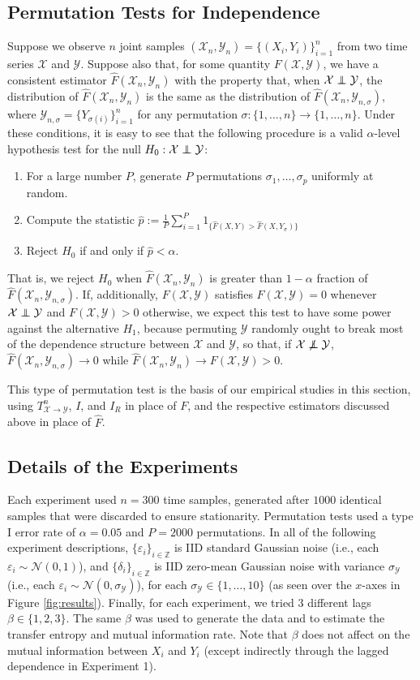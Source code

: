 \documentclass{article} %
\newcommand{\e}{\varepsilon}                        %
\newcommand{\X}{\mathcal{X}}                        %
\newcommand{\Y}{\mathcal{Y}}                        %
\renewcommand{\hat}{\widehat}
\newcommand\ind{\protect\mathpalette{\protect\independenT}{\perp}}
\def\independenT#1#2{\mathrel{\rlap{$#1#2$}\mkern2mu{#1#2}}}
\begin{document}
\subsection{Permutation Tests for Independence}
Suppose we observe $n$ joint samples $(\X_n,\Y_n) = \{(X_i,Y_i)\}_{i = 1}^n$
from two time series $\X$ and $\Y$. Suppose also that, for some quantity
$F(\X,\Y)$, we have a consistent estimator $\hat F(\X_n,\Y_n)$ with the
property that, when $\X \ind \Y$, the distribution of $\hat F(\X_n,\Y_n)$ is
the same as the distribution of $\hat F(\X_n,\Y_{n,\sigma})$, where
$\Y_{n,\sigma} = \{Y_{\sigma(i)}\}_{i = 1}^n$ for any permutation
$\sigma : \{1,\dots,n\} \to \{1,\dots,n\}$. Under these conditions, it is easy
to see that the following procedure is a valid $\alpha$-level hypothesis test
for the null $H_0 : \X \ind \Y$:
\begin{enumerate}
\item For a large number $P$, generate $P$ permutations
$\sigma_1,\dots,\sigma_p$ uniformly at random.
\item Compute the statistic
$\hat p := \frac{1}{P} \sum_{i = 1}^P 1_{\{\hat F(X,Y) > \hat F(X,Y_\sigma)\}}$
\item Reject $H_0$ if and only if $\hat p < \alpha$.
\end{enumerate}
That is, we reject $H_0$ when $\hat F(\X_n,\Y_n)$ is greater than $1 - \alpha$
fraction of $\hat F(\X_n,\Y_{n,\sigma})$. If, additionally, $F(\X,\Y)$
satisfies $F(\X,\Y) = 0$ whenever $\X \ind \Y$ and $F(\X,\Y) > 0$ otherwise,
we expect this test to have some power against the alternative $H_1$, because
permuting $\Y$ randomly ought to break most of the dependence structure between
$\X$ and $\Y$, so that, if $\X \not\ind \Y$,
$\hat F(\X_n,\Y_{n,\sigma}) \to 0$ while $\hat F(\X_n,\Y_n) \to F(\X,\Y) > 0$.

This type of permutation test is the basis of our empirical studies in this
section, using $T_{\X \to \Y}^n$, $I$, and $I_R$ in place of $F$, and the
respective estimators discussed above in place of $\hat F$.

\subsection{Details of the Experiments}
Each experiment used $n = 300$ time samples, generated after $1000$ identical
samples that were discarded to ensure stationarity. Permutation tests used a
type I error rate of $\alpha = 0.05$ and $P = 2000$ permutations. In all of the
following experiment descriptions, $\{\e_i\}_{i \in \mathbb{Z}}$ is IID
standard Gaussian noise (i.e., each $\e_i \sim \mathcal{N}(0,1)$), and
$\{\delta_i\}_{i \in \mathbb{Z}}$ is IID zero-mean Gaussian noise with variance
$\sigma_\Y$ (i.e., each $\e_i \sim \mathcal{N}(0,\sigma_\Y)$), for each
$\sigma_\Y \in \{1,\dots,10\}$ (as seen over the $x$-axes in Figure
\ref{fig:results}). Finally, for each experiment, we tried $3$ different lags
$\beta \in \{1,2,3\}$. The same $\beta$ was used to generate the data and to
estimate the transfer entropy and mutual information rate. Note that $\beta$
does not affect on the mutual information between $X_i$ and $Y_i$ (except
indirectly through the lagged dependence in Experiment 1).
\end{document}
